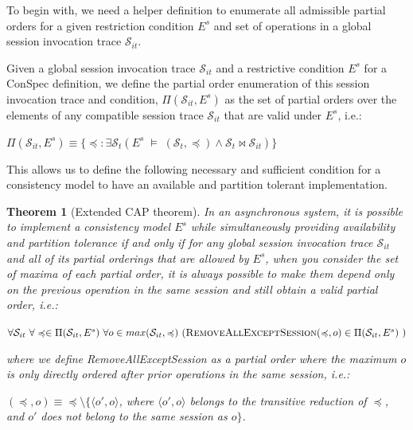 \documentclass[journal,compsoc]{IEEEtran}
\newtheorem{theorem}{Theorem}[section]
\begin{document}
To begin with, we need a helper definition to enumerate all admissible partial orders for a given restriction condition $E^s$ and set of operations in a global session invocation trace $\mathcal{S}_{it}$.

\begin{definition} \label{def:allpos}
Given a global session invocation trace $\mathcal{S}_{it}$ and a restrictive condition $E^s$
for a ConSpec definition, we define the partial order enumeration
of this session invocation trace and condition, $\Pi(\mathcal{S}_{it},E^s)$ as
the set of partial orders over the elements of any compatible session trace $\mathcal{S}_{it}$ that are valid
under $E^s$, i.e.:


$\Pi(\mathcal{S}_{it},E^s) \equiv  \{\preccurlyeq: \exists \mathcal{S}_{t} \left(  E^s\; \vDash \; \left( {\mathcal{S}_{t}}, \preccurlyeq \right) \wedge \mathcal{S}_{t}\bowtie \mathcal{S}_{it} \right) \}$
\end{definition}

This allows us to define the following necessary and sufficient condition
for a consistency model to have an available and partition tolerant
implementation.

\begin{theorem}[Extended CAP theorem] 
In an asynchronous system, it is possible to implement a consistency model $E^s$ while simultaneously providing availability and partition tolerance if and only if for any global session invocation trace $\mathcal{S}_{it}$ and all of its partial orderings that are allowed by $E^s$, when you consider the set of maxima of each partial order, it is always possible to make them depend only on the previous operation in the same session and still obtain a valid partial order, i.e.:


\noindent $\forall \mathcal{S}_{it} ~ \forall \preccurlyeq \in \Pi(\mathcal{S}_{it},E^s) ~ \forall o \in max(\mathcal{S}_{it}, \preccurlyeq) ~ (\textsc{RemoveAllExceptSession}(\preccurlyeq,o) \in \Pi(\mathcal{S}_{it},E^s) ~ ) $

where we define {\sc RemoveAllExceptSession} as a partial order where the maximum $o$ is only directly ordered after prior operations in the same session, i.e.:

$(\preccurlyeq,o) \equiv \preccurlyeq \setminus \{ \langle o',o \rangle$, where $\langle o',o \rangle$ belongs to the transitive reduction of $\preccurlyeq$, and $o'$ does not belong to the same session as $o\}$.



 \end{theorem} \label{thrm:cap}
\end{document}
